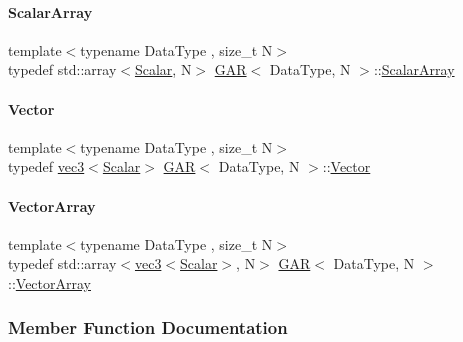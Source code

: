 \mbox{\label{class_g_a_r_a0b446684ae922457a3bf86c904085d8a}} 
\paragraph{\texorpdfstring{Scalar\+Array}{ScalarArray}}
{\footnotesize\ttfamily template$<$typename Data\+Type , size\+\_\+t N$>$ \\
typedef std\+::array$<$\mbox{\hyperlink{class_g_a_r_a2ae44eda8e28d5dd26cf707dcda69314}{Scalar}}, N$>$ \mbox{\hyperlink{class_g_a_r}{G\+AR}}$<$ Data\+Type, N $>$\+::\mbox{\hyperlink{class_g_a_r_a0b446684ae922457a3bf86c904085d8a}{Scalar\+Array}}}

\mbox{\label{class_g_a_r_ad2f5b930feb3831a717f96155b3ff74e}} 
\paragraph{\texorpdfstring{Vector}{Vector}}
{\footnotesize\ttfamily template$<$typename Data\+Type , size\+\_\+t N$>$ \\
typedef \mbox{\hyperlink{structvec3}{vec3}}$<$\mbox{\hyperlink{class_g_a_r_a2ae44eda8e28d5dd26cf707dcda69314}{Scalar}}$>$ \mbox{\hyperlink{class_g_a_r}{G\+AR}}$<$ Data\+Type, N $>$\+::\mbox{\hyperlink{class_g_a_r_ad2f5b930feb3831a717f96155b3ff74e}{Vector}}}

\mbox{\label{class_g_a_r_a5818e17eb203504af6e10f38fc38d378}} 
\paragraph{\texorpdfstring{Vector\+Array}{VectorArray}}
{\footnotesize\ttfamily template$<$typename Data\+Type , size\+\_\+t N$>$ \\
typedef std\+::array$<$\mbox{\hyperlink{structvec3}{vec3}}$<$\mbox{\hyperlink{class_g_a_r_a2ae44eda8e28d5dd26cf707dcda69314}{Scalar}}$>$, N$>$ \mbox{\hyperlink{class_g_a_r}{G\+AR}}$<$ Data\+Type, N $>$\+::\mbox{\hyperlink{class_g_a_r_a5818e17eb203504af6e10f38fc38d378}{Vector\+Array}}}



\subsubsection{Member Function Documentation}
\mbox{\label{class_g_a_r_a152aa5eea95fe568b010d85a7ba23bf7}} 
